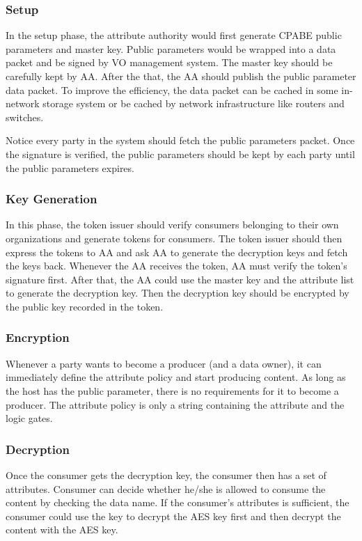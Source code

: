 \subsubsection{Setup}
In the setup phase, the attribute authority would first generate CPABE public parameters and master key.
Public parameters would be wrapped into a data packet and be signed by VO management system.
The master key should be carefully kept by AA.
After the that, the AA should publish the public parameter data packet.
To improve the efficiency, the data packet can be cached in some in-network storage system or be cached by network infrastructure like routers and switches.

Notice every party in the system should fetch the public parameters packet.
Once the signature is verified, the public parameters should be kept by each party until the public parameters expires.

\subsubsection{Key Generation}
In this phase, the token issuer should verify consumers belonging to their own organizations and generate tokens for consumers.
The token issuer should then express the tokens to AA and ask AA to generate the decryption keys and fetch the keys back.
Whenever the AA receives the token, AA must verify the token's signature first.
After that, the AA could use the master key and the attribute list to generate the decryption key.
Then the decryption key should be encrypted by the public key recorded in the token.

\subsubsection{Encryption}
Whenever a party wants to become a producer (and a data owner), it can immediately define the attribute policy and start producing content.
As long as the host has the public parameter, there is no requirements for it to become a producer.
The attribute policy is only a string containing the attribute and the logic gates.

\subsubsection{Decryption}
Once the consumer gets the decryption key, the consumer then has a set of attributes.
Consumer can decide whether he/she is allowed to consume the content by checking the data name.
If the consumer's attributes is sufficient, the consumer could use the key to decrypt the AES key first and then decrypt the content with the AES key.